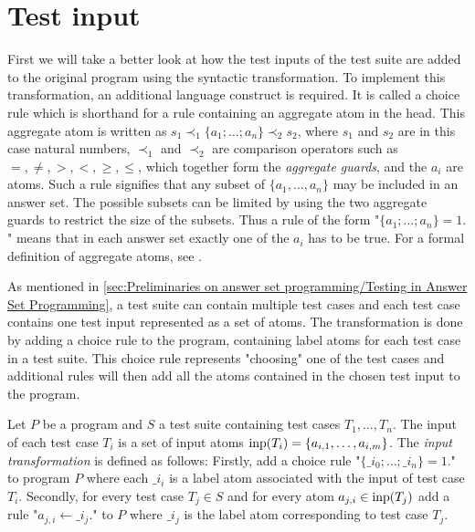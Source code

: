 \section{Test input}
\label{sec:Computing coverage metrics for propositional programs/Test input}
First we will take a better look at how the test inputs of the test suite are added to the original program using the syntactic transformation. To implement this transformation, an additional language construct is required. It is called a choice rule which is shorthand for a rule containing an aggregate atom in the head. This aggregate atom is written as \(s_1 \prec_1 \{a_1; \ldots; a_n\} \prec_2 s_2\), where $s_1$ and $s_2$ are in this case natural numbers, $\prec_1$ and $\prec_2$ are comparison operators such as $=, \neq, >, <, \geq, \leq$, which together form the \emph{aggregate guards}, and the $a_i$ are atoms. Such a rule signifies that any subset of $\{a_1, \ldots, a_n\}$ may be included in an answer set. The possible subsets can be limited by using the two aggregate guards to restrict the size of the subsets. Thus a rule of the form "\(\{a_1; \ldots;a_n\} = 1.\)" means that in each answer set exactly one of the $a_i$ has to be true. For a formal definition of aggregate atoms, see \textcite{Geb+15}.

As mentioned in \cref{sec:Preliminaries on answer set programming/Testing in Answer Set Programming}, a test suite can contain multiple test cases and each test case contains one test input represented as a set of atoms. The transformation is done by adding a choice rule to the program, containing label atoms for each test case in a test suite. This choice rule represents "choosing" one of the test cases and additional rules will then add all the atoms contained in the chosen test input to the program.

\begin{definition}
\label{def:input transforamtion}
    Let $P$ be a program and $S$ a test suite containing test cases \(T_1, \ldots, T_n\). The input of each test case $T_i$ is a set of input atoms \(\operatorname{inp}(T_i) = \{a_{i,1}, \ldots,a_{i,m}\}\). The \emph{input transformation} is defined as follows:
    Firstly, add a choice rule "\(\{\_i_0; \ldots;\_i_n\} = 1.\)" to program $P$  where each $\_i_i$ is a label atom associated with the input of test case $T_i$. Secondly, for every test case \( T_j \in S\) and for every atom \( a_{j,i} \in \operatorname{inp}(T_j)\) add a rule "\(a_{j,i} \leftarrow \_i_j.\)" to $P$ where $\_i_j$ is the label atom corresponding to test case $T_j$.
\end{definition} 

